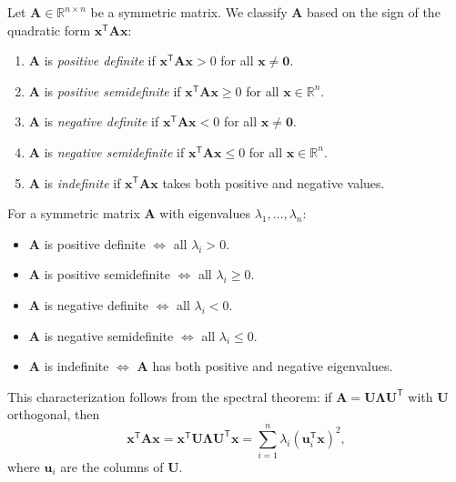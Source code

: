 \begin{definition}\label{def:definiteness}
  Let $\mathbf{A} \in \mathbb{R}^{n \times n}$ be a symmetric matrix. We classify $\mathbf{A}$ based on the sign of the quadratic form $\mathbf{x}^{\mathsf{T}}\mathbf{A}\mathbf{x}$:
  \begin{enumerate}
    \item $\mathbf{A}$ is \emph{positive definite} if $\mathbf{x}^{\mathsf{T}}\mathbf{A}\mathbf{x} > 0$ for all $\mathbf{x} \neq \mathbf{0}$.
    \item $\mathbf{A}$ is \emph{positive semidefinite} if $\mathbf{x}^{\mathsf{T}}\mathbf{A}\mathbf{x} \geq 0$ for all $\mathbf{x} \in \mathbb{R}^n$.
    \item $\mathbf{A}$ is \emph{negative definite} if $\mathbf{x}^{\mathsf{T}}\mathbf{A}\mathbf{x} < 0$ for all $\mathbf{x} \neq \mathbf{0}$.
    \item $\mathbf{A}$ is \emph{negative semidefinite} if $\mathbf{x}^{\mathsf{T}}\mathbf{A}\mathbf{x} \leq 0$ for all $\mathbf{x} \in \mathbb{R}^n$.
    \item $\mathbf{A}$ is \emph{indefinite} if $\mathbf{x}^{\mathsf{T}}\mathbf{A}\mathbf{x}$ takes both positive and negative values.
  \end{enumerate}
\end{definition}

\begin{remark}
  For a symmetric matrix $\mathbf{A}$ with eigenvalues $\lambda_1,\dots,\lambda_n$:
  \begin{itemize}
    \item $\mathbf{A}$ is positive definite $\Leftrightarrow$ all $\lambda_i > 0$.
    \item $\mathbf{A}$ is positive semidefinite $\Leftrightarrow$ all $\lambda_i \geq 0$.
    \item $\mathbf{A}$ is negative definite $\Leftrightarrow$ all $\lambda_i < 0$.
    \item $\mathbf{A}$ is negative semidefinite $\Leftrightarrow$ all $\lambda_i \leq 0$.
    \item $\mathbf{A}$ is indefinite $\Leftrightarrow$ $\mathbf{A}$ has both positive and negative eigenvalues.
  \end{itemize}
  This characterization follows from the spectral theorem: if $\mathbf{A} = \mathbf{U}\mathbf{\Lambda}\mathbf{U}^{\mathsf{T}}$ with $\mathbf{U}$ orthogonal, then
  \[
    \mathbf{x}^{\mathsf{T}}\mathbf{A}\mathbf{x} = \mathbf{x}^{\mathsf{T}}\mathbf{U}\mathbf{\Lambda}\mathbf{U}^{\mathsf{T}}\mathbf{x} = \sum_{i=1}^{n} \lambda_i (\mathbf{u}_i^{\mathsf{T}}\mathbf{x})^2,
  \]
  where $\mathbf{u}_i$ are the columns of $\mathbf{U}$.
\end{remark}

